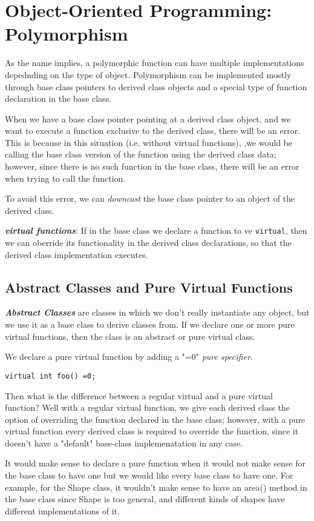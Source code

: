 \documentclass{article}
\begin{document}
\section{Object-Oriented Programming: Polymorphism}
As the name implies, a polymorphic function can have multiple implementations depednding on the type of object.
Polymorphism can be implemented mostly through base class pointers to derived class objects and a special type of
function declaration in the base class.

When we have a base class pointer pointing at a derived class object, and we want to execute a function
exclusive to the derived class, there will be an error. This is because in this situation (i.e. without virtual 
functions), ,we would be calling the base class version of the function using the derived class data; however, 
since there is no such function in the base class, there will be an error when trying to call the function.

To avoid this error, we can \textit{downcast} the base class pointer to an object of the derived class. 

\textbf{\textit{virtual functions}}: If in the base class we declare a function to ve \texttt{virtual}, then 
we can oberride its functionality in the derived class declarations, so that the derived class implementation
executes.
\subsection{Abstract Classes and Pure Virtual Functions}
\textbf{\textit{Abstract Classes}} are classes in which we don't really instantiate any object, but we use it 
as a base class to derive classes from. If we declare one or more pure virtual functions, then the class is an
abstract or pure virtual class.

We declare a pure virtual function by adding a "=0" \textit{pure specifier}. 
\begin{verbatim}
virtual int foo() =0;
\end{verbatim}
Then what is the difference between a regular virtual and a pure virtual function? Well with a regular virtual 
function, we give each derived class the option of overriding the function declared in the base class; however,
with a pure virtual function every derived class is required to override the function, since it doesn't have a
"default" base-class implemenatation in any case. 

It would make sense to declare a pure function when it would not make sense for the base class to have one but 
we would like every base class to have one. For example, for the Shape class, it wouldn't make sense to 
have an area() method in the base class since Shape is too general, and different kinds of shapes have different
implementations of it.
\end{document}

